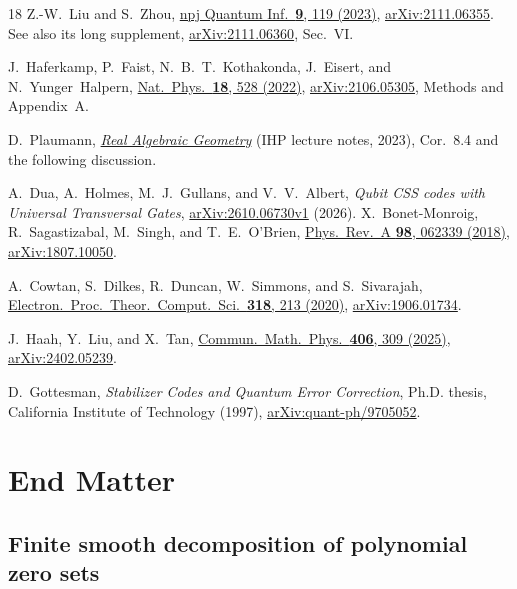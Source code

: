 \documentclass[aps,prl,reprint,notitlepage,nofootinbib,nobibnotes]{revtex4-2}
\begin{document}
\begin{thebibliography}{18}
Z.-W.~Liu and S.~Zhou,
\href{https://doi.org/10.1038/s41534-023-00788-4}
{npj Quantum Inf.\ \textbf{9}, 119 (2023)},
\href{https://arxiv.org/abs/2111.06355}{arXiv:2111.06355}.
See also its long supplement,
\href{https://arxiv.org/abs/2111.06360}{arXiv:2111.06360}, Sec.~VI.

J.~Haferkamp, P.~Faist, N.~B.~T.~Kothakonda, J.~Eisert, and
N.~Yunger~Halpern,
\href{https://doi.org/10.1038/s41567-022-01539-6}
{Nat.\ Phys.\ \textbf{18}, 528 (2022)},
\href{https://arxiv.org/abs/2106.05305}{arXiv:2106.05305},
Methods and Appendix~A.

D.~Plaumann,
\href{https://wwwold.mathematik.tu-dortmund.de/~dplauman/notes/rag-ihp.pdf}
{\emph{Real Algebraic Geometry}}
(IHP lecture notes, 2023), Cor.~8.4 and the following discussion.

A.~Dua, A.~Holmes, M.~J.~Gullans, and V.~V.~Albert,
\emph{Qubit CSS codes with Universal Transversal Gates},
\href{https://arxiv.org/abs/2610.06730v1}{arXiv:2610.06730v1} (2026).
X.~Bonet-Monroig, R.~Sagastizabal, M.~Singh, and T.~E.~O'Brien,
\href{https://doi.org/10.1103/PhysRevA.98.062339}
{Phys.\ Rev.\ A \textbf{98}, 062339 (2018)},
\href{https://arxiv.org/abs/1807.10050}{arXiv:1807.10050}.

A.~Cowtan, S.~Dilkes, R.~Duncan, W.~Simmons, and S.~Sivarajah,
\href{https://doi.org/10.4204/EPTCS.318.13}
{Electron.\ Proc.\ Theor.\ Comput.\ Sci.\ \textbf{318}, 213 (2020)},
\href{https://arxiv.org/abs/1906.01734}{arXiv:1906.01734}.

J.~Haah, Y.~Liu, and X.~Tan,
\href{https://doi.org/10.1007/s00220-025-05480-6}
{Commun.\ Math.\ Phys.\ \textbf{406}, 309 (2025)},
\href{https://arxiv.org/abs/2402.05239}{arXiv:2402.05239}.

D.~Gottesman,
\emph{Stabilizer Codes and Quantum Error Correction},
Ph.D. thesis, California Institute of Technology (1997),
\href{https://arxiv.org/abs/quant-ph/9705052}{arXiv:quant-ph/9705052}.

\end{thebibliography}

\section*{End Matter}
\subsection*{Finite smooth decomposition of polynomial zero sets}
\end{document}
